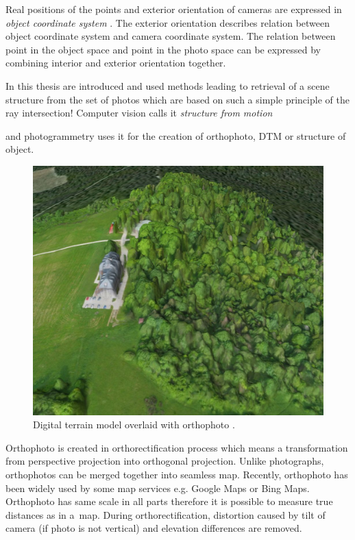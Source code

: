 \documentclass[a4paper,12pt]{article}
\newcommand{\term}[1]{%
{\it #1}%
}
\begin{document}
Real positions of the points and exterior orientation of cameras are expressed in \term{object coordinate system}. 
The exterior orientation describes relation between object coordinate system and camera coordinate system. 
The relation between point in the object 
space and point in the photo space can be expressed by combining interior and exterior orientation together.

In this thesis are introduced and used methods leading to retrieval of a scene structure from 
the set of photos which are based on such a simple principle of the ray intersection! Computer vision calls it \term{structure from motion}
and photogrammetry uses it for the creation of orthophoto, DTM or structure of object.


\begin{figure}[h]
    \centering
    \includegraphics[scale=0.3]{figures/dtm.jpg}
    \caption{Digital terrain model overlaid with orthophoto \cite{kbosak2010bezmiechowa}.}
\end{figure}


Orthophoto is created in 
orthorectification process which means a transformation from perspective projection into orthogonal projection.
Unlike photographs, orthophotos can be merged together into seamless map. Recently, 
orthophoto has been widely used by some map services e.g. Google Maps or Bing Maps. Orthophoto 
has same scale in all parts therefore it is possible to measure true distances as in a~map. 
During orthorectification, distortion 
caused by tilt of camera (if photo is not vertical) and elevation differences are removed.
\end{document}
